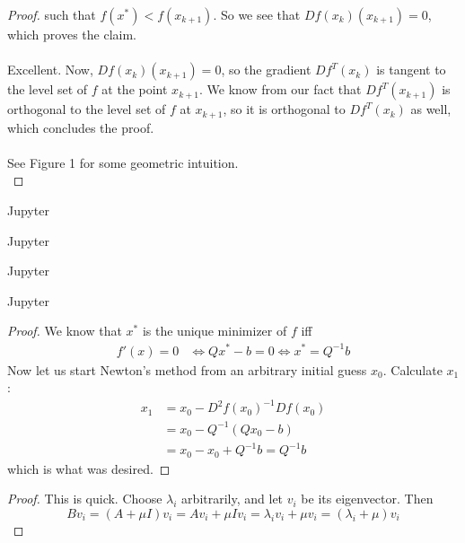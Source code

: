 \documentclass[12pt]{article}
\newenvironment{problem}[2][Problem]{\begin{trivlist}
\item[\hskip \labelsep {\bfseries #1}\hskip \labelsep {\bfseries #2.}]}{\end{trivlist}}
\theoremstyle{definition}
\theoremstyle{definition}
\theoremstyle{definition}
\theoremstyle{definition}
\begin{document}
\begin{problem}{9.5}
\begin{proof}
such that $f(x^*) < f(x_{k+1})$. So we see that $Df(x_k)(x_{k+1}) = 0$, which proves the claim. \\
\\
Excellent. Now, $Df(x_k)(x_{k+1}) = 0$, so the gradient $Df^T(x_k)$ is tangent to the level set of $f$ at the point $x_{k+1}$. We know from our fact that $Df^T(x_{k+1})$ is orthogonal to the level set of $f$ at $x_{k+1}$, so it is orthogonal to $Df^T(x_k)$ as well, which concludes the proof. \\
\\
See Figure 1  for some geometric intuition. \\
\end{proof}
\end{problem}

\begin{problem}{9.6}
Jupyter
\end{problem}

\begin{problem}{9.7}
Jupyter
\end{problem}

\begin{problem}{9.8}
Jupyter
\end{problem}

\begin{problem}{9.9}
Jupyter
\end{problem}

\begin{problem}{9.10} 
\begin{proof}
We know that $x^*$ is the unique minimizer of $f$ iff 
\begin{align*}
f'(x) = 0 &\iff Qx^* - b = 0 \iff x^* = Q^{-1}b 
\end{align*}
Now let us start Newton's method from an arbitrary initial guess $x_0$. Calculate $x_1$:
\begin{align*}
x_1 &= x_0 - D^2f(x_0)^{-1}Df(x_0) \\
&= x_0 - Q^{-1} (Qx_0 - b) \\
&= x_0 - x_0 + Q^{-1}b = Q^{-1}b
\end{align*}
which is what was desired.
\end{proof}
\end{problem}

\begin{problem}{9.12}
\begin{proof}
This is quick. Choose $\lambda_i$ arbitrarily, and let $v_i$ be its eigenvector. Then
$$
Bv_i = (A + \mu I)v_i = Av_i + \mu I v_i = \lambda_i v_i + \mu v_i = (\lambda_i + \mu) v_i
$$
\end{proof}
\end{problem}
\end{document}

